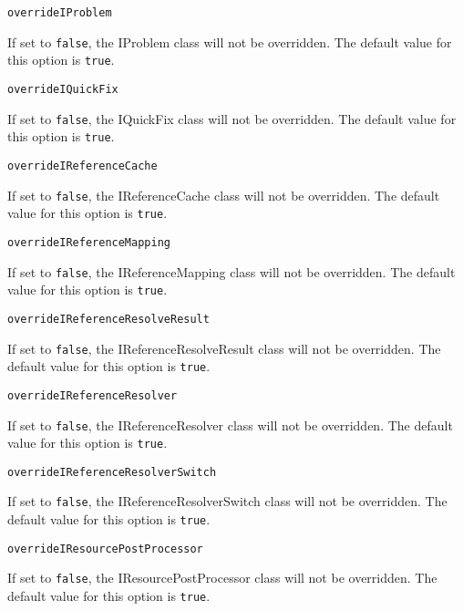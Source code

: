\noindent\texttt{overrideIProblem}
\begin{myindentpar}{1cm}
If set to \texttt{false}, the IProblem class will not be overridden. The default value for this option is \texttt{true}.
\end{myindentpar}

\noindent\texttt{overrideIQuickFix}
\begin{myindentpar}{1cm}
If set to \texttt{false}, the IQuickFix class will not be overridden. The default value for this option is \texttt{true}.
\end{myindentpar}

\noindent\texttt{overrideIReferenceCache}
\begin{myindentpar}{1cm}
If set to \texttt{false}, the IReferenceCache class will not be overridden. The default value for this option is \texttt{true}.
\end{myindentpar}

\noindent\texttt{overrideIReferenceMapping}
\begin{myindentpar}{1cm}
If set to \texttt{false}, the IReferenceMapping class will not be overridden. The default value for this option is \texttt{true}.
\end{myindentpar}

\noindent\texttt{overrideIReferenceResolveResult}
\begin{myindentpar}{1cm}
If set to \texttt{false}, the IReferenceResolveResult class will not be overridden. The default value for this option is \texttt{true}.
\end{myindentpar}

\noindent\texttt{overrideIReferenceResolver}
\begin{myindentpar}{1cm}
If set to \texttt{false}, the IReferenceResolver class will not be overridden. The default value for this option is \texttt{true}.
\end{myindentpar}

\noindent\texttt{overrideIReferenceResolverSwitch}
\begin{myindentpar}{1cm}
If set to \texttt{false}, the IReferenceResolverSwitch class will not be overridden. The default value for this option is \texttt{true}.
\end{myindentpar}

\noindent\texttt{overrideIResourcePostProcessor}
\begin{myindentpar}{1cm}
If set to \texttt{false}, the IResourcePostProcessor class will not be overridden. The default value for this option is \texttt{true}.
\end{myindentpar}

